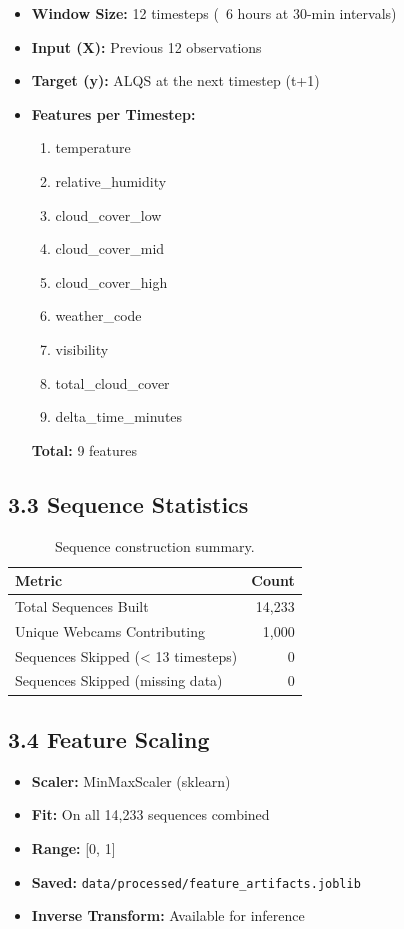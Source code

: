\documentclass[11pt,a4paper]{article}
\begin{document}
\begin{itemize}
    \item \textbf{Window Size:} 12 timesteps (~6 hours at 30-min intervals)
    \item \textbf{Input (X):} Previous 12 observations
    \item \textbf{Target (y):} ALQS at the next timestep (t+1)
    \item \textbf{Features per Timestep:}
    \begin{enumerate}
        \item temperature
        \item relative\_humidity
        \item cloud\_cover\_low
        \item cloud\_cover\_mid
        \item cloud\_cover\_high
        \item weather\_code
        \item visibility
        \item total\_cloud\_cover
        \item delta\_time\_minutes
    \end{enumerate}
    \textbf{Total:} 9 features
\end{itemize}

\subsection{3.3 Sequence Statistics}

\begin{table}[h]
\centering
\begin{tabular}{lr}
\toprule
\textbf{Metric} & \textbf{Count} \\
\midrule
Total Sequences Built & 14,233 \\
Unique Webcams Contributing & 1,000 \\
Sequences Skipped (< 13 timesteps) & 0 \\
Sequences Skipped (missing data) & 0 \\
\bottomrule
\end{tabular}
\caption{Sequence construction summary.}
\end{table}

\subsection{3.4 Feature Scaling}

\begin{itemize}
    \item \textbf{Scaler:} MinMaxScaler (sklearn)
    \item \textbf{Fit:} On all 14,233 sequences combined
    \item \textbf{Range:} [0, 1]
    \item \textbf{Saved:} \texttt{data/processed/feature\_artifacts.joblib}
    \item \textbf{Inverse Transform:} Available for inference
\end{itemize}
\end{document}
